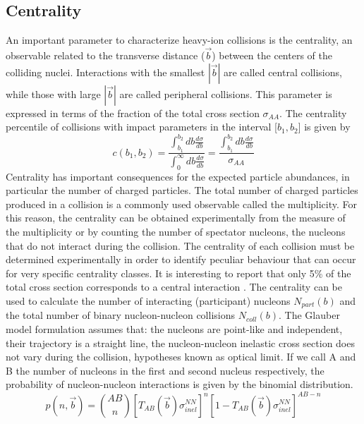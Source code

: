 \documentclass[12pt,a4paper]{book}
\begin{document}
	\subsection{Centrality}
	An important parameter to characterize heavy-ion collisions is the centrality, an observable related to the transverse distance ($\vec{b}$) between the centers of the colliding nuclei. Interactions with the smallest $|\vec{b}|$ are called central collisions, while those with large $|\vec{b}|$ are called peripheral collisions. This parameter is expressed in terms of the fraction of the total cross section $\sigma_{AA}$. The centrality percentile of collisions with impact parameters in the interval [$b_1,b_2$] is given by
	\begin{equation}
		c(b_1,b_2)=\frac{\int_{b_1}^{b_2} db \frac{d\sigma}{db}}{\int_{0}^{\infty} db \frac{d\sigma}{db}} = \frac{\int_{b_1}^{b_2} db \frac{d\sigma}{db}}{\sigma_{AA}}
		\label{eq:centrrality1}
	\end{equation}
	Centrality has important consequences for the expected particle abundances, in particular the number of charged particles. The total number of charged particles produced in a collision is a commonly used observable called the multiplicity. For this reason, the centrality can be obtained experimentally from the measure of the multiplicity or by counting the number of spectator nucleons, the nucleons that do not interact during the collision. The centrality of each collision must be determined experimentally in order to identify peculiar behaviour that can occur for very specific centrality classes. It is interesting to report that only 5\% of the total cross section corresponds to a central interaction \cite{amsdottorato9036}.
	The centrality can be used to calculate the number of interacting (participant) nucleons $N_{part}(b)$ and the total number of binary nucleon-nucleon collisions $N_{coll}(b)$. The Glauber model formulation \cite{Miller_2007} assumes that: the nucleons are point-like and independent, their trajectory is a straight line, the nucleon-nucleon inelastic cross section does not vary during the collision, hypotheses known as optical limit. If we call A and B the number of nucleons in the first and second nucleus respectively, the probability of nucleon-nucleon interactions is given by the binomial distribution.
	\begin{equation}
		p(n,\vec{b})= \binom{AB}{n} \left[T_{AB}(\vec{b}) \sigma_{inel}^{NN}\right]^n \left[1-T_{AB}(\vec{b}) \sigma_{inel}^{NN}\right]^{AB-n}
		\label{eq:prob_interaction}
	\end{equation}
\end{document}
